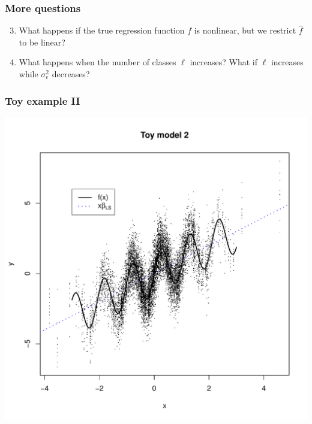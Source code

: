 \documentclass{beamer}
\begin{document}
\begin{frame}
\frametitle{More questions}
\begin{enumerate}
\setcounter{enumi}{2}
\item
What happens if the true regression function $f$ is nonlinear,
but we restrict $\hat{f}$ to be linear?
\item
What happens when the number of classes $\ell$ increases?
What if $\ell$ increases while $\sigma^2_\epsilon$ decreases?
\end{enumerate}
\end{frame}

\begin{frame}
\frametitle{Toy example II}
\begin{center}
\includegraphics[scale = 0.4]{toy2_plot.pdf}
\end{center}
\end{frame}
\end{document}
